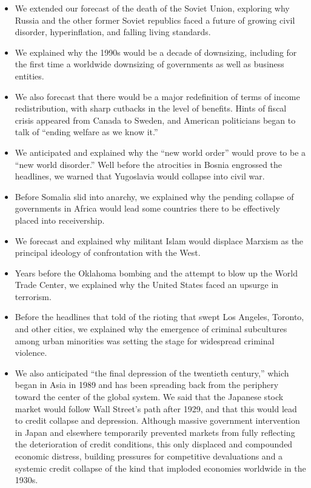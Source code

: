 \begin{paracol}{2}
	\switchcolumn*
	\begin{itemize}
		\item We extended our forecast of the death of the Soviet Union, exploring why Russia and the other former Soviet republics faced a future of growing civil disorder, hyperinflation, and falling living standards. 
		\item We explained why the 1990s would be a decade of downsizing, including for the first time a worldwide downsizing of governments as well as business entities.
		\item We also forecast that there would be a major redefinition of terms of income redistribution, with sharp cutbacks in the level of benefits. Hints of fiscal crisis appeared from Canada to Sweden, and American politicians began to talk of ``ending welfare as we know it.''
		\item We anticipated and explained why the ``new world order'' would prove to be a ``new world disorder.'' Well before the atrocities in Bosnia engrossed the headlines, we warned that Yugoslavia would collapse into civil war.
		\item Before Somalia slid into anarchy, we explained why the pending collapse of governments in Africa would lead some countries there to be effectively placed into receivership.
		\item We forecast and explained why militant Islam would displace Marxism as the principal ideology of confrontation with the West.
		\item Years before the Oklahoma bombing and the attempt to blow up the World Trade Center, we explained why the United States faced an upsurge in terrorism.
		\item Before the headlines that told of the rioting that swept Los Angeles, Toronto, and other cities, we explained why the emergence of criminal subcultures among urban minorities was setting the stage for widespread criminal violence.
		\item We also anticipated ``the final depression of the twentieth century,'' which began in Asia in 1989 and has been spreading back from the periphery toward the center of the global system. We said that the Japanese stock market would follow Wall Street's path after 1929, and that this would lead to credit collapse and depression. Although massive government intervention in Japan and elsewhere temporarily prevented markets from fully reflecting the deterioration of credit conditions, this only displaced and compounded economic distress, building pressures for competitive devaluations and a systemic credit collapse of the kind that imploded economies worldwide in the 1930s.
	\end{itemize}
	

\end{paracol}
